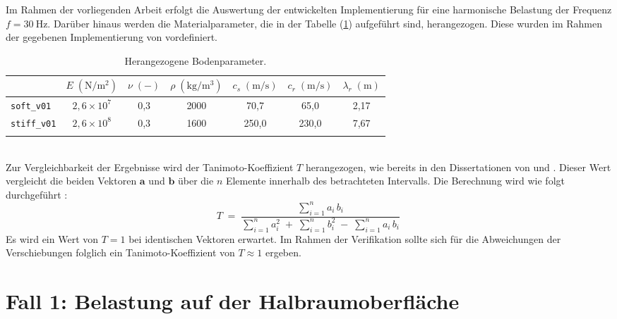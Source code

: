 Im Rahmen der vorliegenden Arbeit erfolgt die Auswertung der entwickelten Implementierung für eine harmonische Belastung der Frequenz $f = 30\ \mathrm{Hz}$. 
Darüber hinaus werden die Materialparameter, die in der Tabelle (\ref{tab:Material_Parameter}) aufgeführt sind, herangezogen. Diese wurden im Rahmen der gegebenen Implementierung von \cite{Freisinger2022} vordefiniert.
\begin{table}[htb]\centering\normalsize
	{\renewcommand{\arraystretch}{1.25} %
		\begin{tabular}{lcccccc}
			\firsthline
			& $E\;(\mathrm{N}/\mathrm{m}^{2})$ & $\nu\;(-)$ & $\rho\;(\mathrm{kg}/\mathrm{m}^{3})$ & $c_s\;(\mathrm{m}/\mathrm{s})$ & $c_r\;(\mathrm{m}/\mathrm{s})$ & $\lambda_r\;(\mathrm{m})$ \\\hline
			\texttt{soft\_v01}  & $2,6\times10^{7}$ & 0,3 & 2000 & 70,7 & 65,0 & 2,17 \\
			\texttt{stiff\_v01} & $2,6\times10^{8}$ & 0,3 & 1600 & 250,0 & 230,0 & 7,67 \\\lasthline
	\end{tabular}}
	\caption{Herangezogene Bodenparameter.}	\label{tab:Material_Parameter}
\end{table}
\\Zur Vergleichbarkeit der Ergebnisse wird der Tanimoto-Koeffizient $T$ herangezogen, wie bereits in den Dissertationen von \cite{Hackenberg2016} und \cite{Freisinger2022}. Dieser Wert vergleicht die beiden Vektoren $\mathbf{a}$ und $\mathbf{b}$ über die $n$ Elemente innerhalb des betrachteten Intervalls. Die Berechnung wird wie folgt durchgeführt \citep{Willett1998}:
\begin{equation}\label{eq:tanimoto}
	T \;=\; 
	\frac{\displaystyle \sum_{i=1}^{n} a_i\,b_i}
	{\displaystyle \sum_{i=1}^{n} a_i^{2}
		\;+\; \sum_{i=1}^{n} b_i^{2}
		\;-\; \sum_{i=1}^{n} a_i\,b_i } \,
\end{equation}
Es wird ein Wert von $T = 1$ bei identischen Vektoren erwartet. Im Rahmen der Verifikation sollte sich für die Abweichungen der Verschiebungen folglich ein Tanimoto-Koeffizient von $T \approx 1$ ergeben.





\section{Fall 1: Belastung auf der Halbraumoberfläche}
\label{sec:verification_c1}

